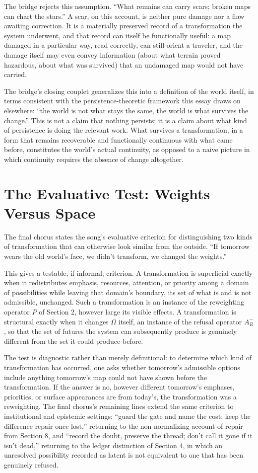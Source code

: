\documentclass[11pt]{article}
\begin{document}
The bridge rejects this assumption. ``What remains can carry scars; broken maps can chart the stars.'' A scar, on this account, is neither pure damage nor a flaw awaiting correction. It is a materially preserved record of a transformation the system underwent, and that record can itself be functionally useful: a map damaged in a particular way, read correctly, can still orient a traveler, and the damage itself may even convey information (about what terrain proved hazardous, about what was survived) that an undamaged map would not have carried.

The bridge's closing couplet generalizes this into a definition of the world itself, in terms consistent with the persistence-theoretic framework this essay draws on elsewhere: ``the world is not what stays the same, the world is what survives the change.'' This is not a claim that nothing persists; it is a claim about what kind of persistence is doing the relevant work. What survives a transformation, in a form that remains recoverable and functionally continuous with what came before, constitutes the world's actual continuity, as opposed to a naive picture in which continuity requires the absence of change altogether.

\section{The Evaluative Test: Weights Versus Space}

The final chorus states the song's evaluative criterion for distinguishing two kinds of transformation that can otherwise look similar from the outside. ``If tomorrow wears the old world's face, we didn't transform, we changed the weights.''

This gives a testable, if informal, criterion. A transformation is superficial exactly when it redistributes emphasis, resources, attention, or priority among a domain of possibilities while leaving that domain's boundary, its set of what is and is not admissible, unchanged. Such a transformation is an instance of the reweighting operator $P$ of Section 2, however large its visible effects. A transformation is structural exactly when it changes $\Omega$ itself, an instance of the refusal operator $A^-_R$, so that the set of futures the system can subsequently produce is genuinely different from the set it could produce before.

The test is diagnostic rather than merely definitional: to determine which kind of transformation has occurred, one asks whether tomorrow's admissible options include anything tomorrow's map could not have shown before the transformation. If the answer is no, however different tomorrow's emphases, priorities, or surface appearances are from today's, the transformation was a reweighting. The final chorus's remaining lines extend the same criterion to institutional and epistemic settings: ``guard the gate and name the cost; keep the difference repair once lost,'' returning to the non-normalizing account of repair from Section 8, and ``record the doubt, preserve the thread; don't call it gone if it isn't dead,'' returning to the ledger distinction of Section 4, in which an unresolved possibility recorded as latent is not equivalent to one that has been genuinely refused.
\end{document}
